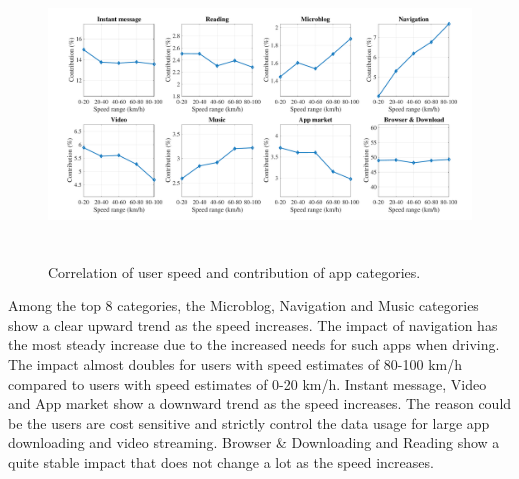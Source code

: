 
\begin{figure}[h]
    \centering
    \includegraphics[width=\linewidth,height=3in]{./figures/large_font/speed_appcat.pdf}
    \vspace{-0.3in}
    \caption{Correlation of user speed and contribution of app categories.}
    \label{fig:speed_appcat}
\end{figure}

Among the top 8 categories, the Microblog, Navigation and Music categories show a clear upward trend as the speed increases.
The impact of navigation has the most steady increase due to the increased needs for such apps when driving.
The impact almost doubles for users with speed estimates of 80-100 km/h compared to users with speed estimates of 0-20 km/h.
Instant message, Video and App market show a downward trend as the speed increases.
The reason could be the users are cost sensitive and strictly control the data usage for large app downloading and video streaming.
Browser \& Downloading and Reading show a quite stable impact that does not change a lot as the speed increases.







